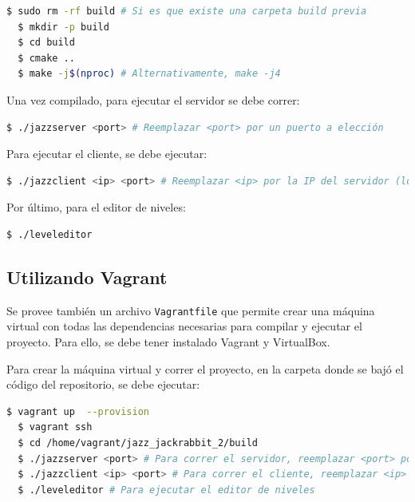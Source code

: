 \documentclass[titlepage,a4paper]{article}
\begin{document}
\begin{lstlisting}[language=sh,caption=Compilación del Proyecto, captionpos=b]
  $ sudo rm -rf build # Si es que existe una carpeta build previa
  $ mkdir -p build
  $ cd build
  $ cmake ..
  $ make -j$(nproc) # Alternativamente, make -j4
\end{lstlisting}

Una vez compilado, para ejecutar el servidor se debe correr:

\begin{lstlisting}[language=sh,caption=Ejecución del Servidor, captionpos=b]
  $ ./jazzserver <port> # Reemplazar <port> por un puerto a elección
\end{lstlisting}

Para ejecutar el cliente, se debe ejecutar:

\begin{lstlisting}[language=sh,caption=Ejecución del Cliente, captionpos=b]
  $ ./jazzclient <ip> <port> # Reemplazar <ip> por la IP del servidor (localhost) y <port> por el puerto
\end{lstlisting}

Por último, para el editor de niveles:

\begin{lstlisting}[language=sh,caption=Ejecución del Editor de Niveles, captionpos=b]
  $ ./leveleditor
\end{lstlisting}

\subsection{Utilizando Vagrant}
Se provee también un archivo \texttt{Vagrantfile} que permite crear una máquina virtual con todas las dependencias necesarias para compilar y ejecutar el proyecto. Para ello, se debe tener instalado Vagrant y VirtualBox.

Para crear la máquina virtual y correr el proyecto, en la carpeta donde se bajó el código del repositorio, se debe ejecutar:

\begin{lstlisting}[language=sh,caption=Creación de la Máquina Virtual, captionpos=b]
  $ vagrant up  --provision
  $ vagrant ssh
  $ cd /home/vagrant/jazz_jackrabbit_2/build
  $ ./jazzserver <port> # Para correr el servidor, reemplazar <port> por un puerto a elección
  $ ./jazzclient <ip> <port> # Para correr el cliente, reemplazar <ip> por la IP del servidor (localhost) y <port> por el puerto
  $ ./leveleditor # Para ejecutar el editor de niveles
\end{lstlisting}
\end{document}
